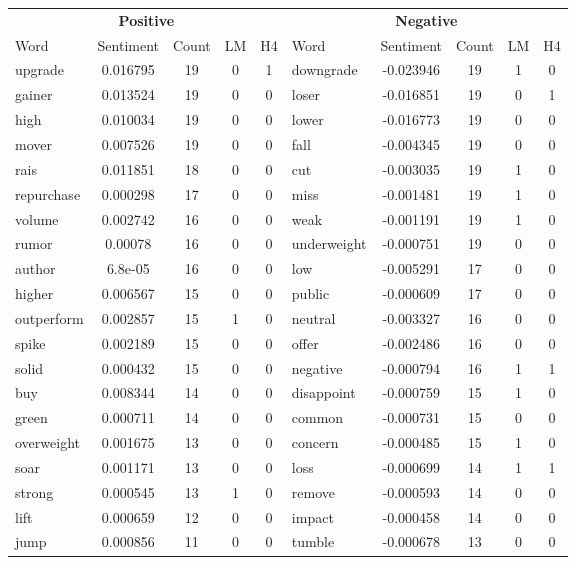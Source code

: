 \documentclass[ oneside,%
                    author={Joshua Felmeden},
                    degree={MEng},
                     title={Sentiment Analysis of Financial Headlines Based on Stock Returns},
                  subtitle={Research}]{dissertation}
\begin{document}
\begin{table}[!ht]
\centering
\begin{tabular}{lcccclcccc}
\multicolumn{5}{c}{\textbf{Positive}} & \multicolumn{5}{c}{\textbf{Negative}} \\
\cmidrule(lr){1-5}
\cmidrule(lr){6-10}
Word & Sentiment & Count & LM & H4 & Word & Sentiment & Count & LM & H4 \\
\cmidrule(lr){1-5}
\cmidrule(lr){6-10}
upgrade & 0.016795 & 19 & 0 & 1 & downgrade & -0.023946 & 19 & 1 & 0 \\
gainer & 0.013524 & 19 & 0 & 0 & loser & -0.016851 & 19 & 0 & 1 \\
high & 0.010034 & 19 & 0 & 0 & lower & -0.016773 & 19 & 0 & 0 \\
mover & 0.007526 & 19 & 0 & 0 & fall & -0.004345 & 19 & 0 & 0 \\
rais & 0.011851 & 18 & 0 & 0 & cut & -0.003035 & 19 & 1 & 0 \\
repurchase & 0.000298 & 17 & 0 & 0 & miss & -0.001481 & 19 & 1 & 0 \\
volume & 0.002742 & 16 & 0 & 0 & weak & -0.001191 & 19 & 1 & 0 \\
rumor & 0.00078 & 16 & 0 & 0 & underweight & -0.000751 & 19 & 0 & 0 \\
author & 6.8e-05 & 16 & 0 & 0 & low & -0.005291 & 17 & 0 & 0 \\
higher & 0.006567 & 15 & 0 & 0 & public & -0.000609 & 17 & 0 & 0 \\
outperform & 0.002857 & 15 & 1 & 0 & neutral & -0.003327 & 16 & 0 & 0 \\
spike & 0.002189 & 15 & 0 & 0 & offer & -0.002486 & 16 & 0 & 0 \\
solid & 0.000432 & 15 & 0 & 0 & negative & -0.000794 & 16 & 1 & 1 \\
buy & 0.008344 & 14 & 0 & 0 & disappoint & -0.000759 & 15 & 1 & 0 \\
green & 0.000711 & 14 & 0 & 0 & common & -0.000731 & 15 & 0 & 0 \\
overweight & 0.001675 & 13 & 0 & 0 & concern & -0.000485 & 15 & 1 & 0 \\
soar & 0.001171 & 13 & 0 & 0 & loss & -0.000699 & 14 & 1 & 1 \\
strong & 0.000545 & 13 & 1 & 0 & remove & -0.000593 & 14 & 0 & 0 \\
lift & 0.000659 & 12 & 0 & 0 & impact & -0.000458 & 14 & 0 & 0 \\
jump & 0.000856 & 11 & 0 & 0 & tumble & -0.000678 & 13 & 0 & 0 \\

\end{tabular}
\end{table}
\end{document}

